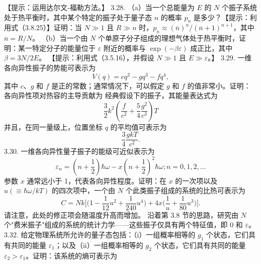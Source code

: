 【提示：运用达尔文-福勒方法。】
3.28. （a）当一个总能量为 \(E\) 的 \(N\) 个振子系统处于热平衡时，其中某个特定的振子处于量子态 \(n\) 的概率 \(p_{n}\) 是多少？【提示：利用式（3.8.25）】证明：当 \(N \gg 1\) 且 \(R \gg n\) 时，\(p_{n} \approx (\overline{n})^{n}/(\overline{n} + 1)^{n+1}\)，其中 \(\overline{n} = R/N\)。
（b）当一个由 \(N\) 个单原子分子组成的理想气体处于热平衡时，证明：某一特定分子的能量位于 \(\varepsilon\) 附近的概率与 \(\exp(-\beta \varepsilon)\) 成正比，其中 \(\beta = 3N/2E\)。
【提示：利用式（3.5.16），并假设 \(N \gg 1\) 且 \(E \gg \varepsilon\)。】
3.29. 一维各向异性振子的势能可表示为
\begin{equation}\tag{3.5.138}\label{eq:3.5.138}
V ( q ) = c q ^{2} - g q ^{3} - f q ^{4} ,
\end{equation}
其中 \(c\)、\(g\) 和 \(f\) 是正的常数；通常情况下，可以假定 \(g\) 和 \(f\) 的值非常小。证明：各向异性项对热容的主导贡献为
经典假设下的振子，其能量表达式为
\begin{equation}\tag{3.5.139}\label{eq:3.5.139}
\frac { 3 } { 2 } k ^{2} \left( \frac { f } { c ^{2} } + \frac { 5 } { 4 } \frac { g ^{2} } { c ^{3} } \right) T
\end{equation}
并且，在同一量级上，位置坐标 \(q\) 的平均值可表示为
\begin{equation}\tag{3.5.140}\label{eq:3.5.140}
{ \frac { 3 } { 4 } } { \frac { g k T } { c ^{2} } } .
\end{equation}
3.30. 一维各向异性量子振子的能级可近似表示为
\begin{equation}\tag{3.5.141}\label{eq:3.5.141}
\varepsilon _ { n } = \left( n + \frac { 1 } { 2 } \right) \hbar \omega - x \left( n + \frac { 1 } { 2 } \right) ^{2} \hbar \omega ;  n = 0 , 1 , 2 , \ldots
\end{equation}
参数 \(x\) 通常远小于 1，代表各向异性程度。证明：在 \(x\) 的一次项以及 \(u(\equiv\hbar\omega/kT)\) 的四次项中，一个由 \(N\) 个此类振子组成的系统的比热可表示为
\begin{equation}\tag{3.5.142}\label{eq:3.5.142}
C = N k \Bigg [ \Bigg ( 1 - \frac { 1 } { 12 } u ^{2} + \frac { 1 } { 24 0 } u ^{4} \Bigg ) + 4 x \Bigg ( \frac { 1 } { u } + \frac { 1 } { 80 } u ^{3} \Bigg ) \Bigg ] .
\end{equation}
请注意，此处的修正项会随温度升高而增加。
沿着第 3.8 节的思路，研究由 \(N\) 个"费米振子"组成的系统的统计力学——这些振子仅具有两个特征值，即 0 和 \(\varepsilon\)。
3.32. 给定物理系统所允许的量子态包括：（i）一组概率相等的 \(g_1\) 个状态，它们具有共同的能量 \(\varepsilon_1\)；以及（ii）一组概率相等的 \(g_2\) 个状态，它们具有共同的能量 \(\varepsilon_2 > \varepsilon_1\)。证明：该系统的熵可表示为
